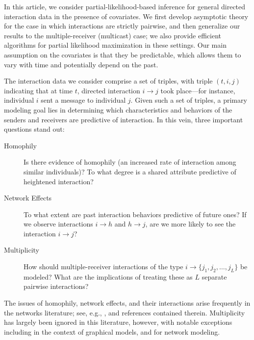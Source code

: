 \documentclass[final]{statsoc}
\begin{document}
In this article, we consider partial-likelihood-based inference for general
directed interaction data in the presence of covariates.  We first develop
asymptotic theory for the case in which interactions are strictly pairwise,
and then generalize our results to the multiple-receiver (multicast) case;
we also provide efficient algorithms for partial likelihood maximization in
these settings.  Our main assumption on the covariates is that they be
predictable, which allows them to vary with time and potentially depend on
the past.

The interaction data we consider comprise a set of triples, with triple
$(t,i,j)$ indicating that at time $t$, directed interaction
$i\rightarrow j$ took place---for instance, individual $i$ sent a message
to individual $j$.  Given such a set of triples, a primary modeling goal lies in
determining which characteristics and behaviors of the senders and
receivers are predictive of interaction.  In this vein, three important
questions stand out:

\begin{description}
    \item[Homophily] Is there evidence of homophily (an increased rate of
    interaction among similar individuals)?  To what degree is a shared
    attribute predictive of heightened interaction?

    \item[Network Effects] To what extent are past interaction behaviors predictive of future ones?
    If we observe interactions $i \to h$ and $h \to j$, are we more likely
    to see the interaction $i \to j$?

    \item[Multiplicity] How should multiple-receiver interactions of the
    type $i \rightarrow \{j_1,j_2,\ldots, j_L\}$ be modeled?  What are the
    implications of treating these as $L$ separate pairwise interactions?
\end{description}

The issues of homophily, network effects, and their interactions arise frequently in the networks literature; see, e.g., \citet{mcpherson2001birds, butts2008relational, aral2009distinguishing, snijders2010introduction}, and
references contained therein.  Multiplicity has largely been ignored in this literature, however, with notable exceptions including
\citet{lunagomez2009geometric} in the context of graphical models, and
\citet{shafiei2010mixed} for network modeling.
\end{document}
